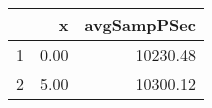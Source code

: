 \begin{table}[h]
\centering
\begin{tabular}{rrr}
  \hline
 & x & avgSampPSec \\ 
  \hline
1 & 0.00 & 10230.48 \\ 
   \hline
2 & 5.00 & 10300.12 \\ 
   \hline
\end{tabular}
\end{table}
